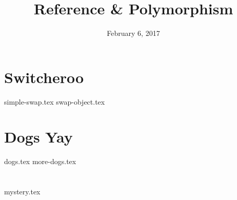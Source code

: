 \documentclass{exam}
\title{Reference \& Polymorphism}
\date{February 6, 2017}
\begin{document}
\maketitle

\section{Switcheroo}
\begin{questions}
{simple-swap.tex}
{swap-object.tex}
\end{questions}

\clearpage

\section{Dogs Yay}
\begin{questions}
{dogs.tex}
\clearpage
{more-dogs.tex}
\end{questions}

\clearpage

\section{}
\begin{questions}
{mystery.tex}
\end{questions}
\end{document}
